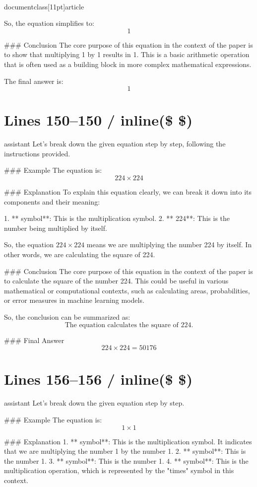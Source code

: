 \\documentclass[11pt]{article}
\begin{document}
So, the equation simplifies to:
\[ 1 \]

### Conclusion
The core purpose of this equation in the context of the paper is to show that multiplying 1 by 1 results in 1. This is a basic arithmetic operation that is often used as a building block in more complex mathematical expressions.

The final answer is:
\[
\boxed{1}
\]


\section*{Lines 150–150 / inline(\$ \$) }
assistant
Let's break down the given equation step by step, following the instructions provided.

### Example
The equation is:
\[ 224 \times 224 \]

### Explanation
To explain this equation clearly, we can break it down into its components and their meaning:

1. ** symbol**: This is the multiplication symbol.
2. ** 224**: This is the number being multiplied by itself.

So, the equation \( 224 \times 224 \) means we are multiplying the number 224 by itself. In other words, we are calculating the square of 224.

### Conclusion
The core purpose of this equation in the context of the paper is to calculate the square of the number 224. This could be useful in various mathematical or computational contexts, such as calculating areas, probabilities, or error measures in machine learning models.

So, the conclusion can be summarized as:
\[ \text{The equation calculates the square of 224.} \]

### Final Answer
\[
\boxed{224 \times 224 = 50176}
\]


\section*{Lines 156–156 / inline(\$ \$) }
assistant
Let's break down the given equation step by step.

### Example
The equation is:
\[ 1 \times 1 \]

### Explanation
1. ** symbol**: This is the multiplication symbol. It indicates that we are multiplying the number 1 by the number 1.
2. ** symbol**: This is the number 1.
3. ** symbol**: This is the number 1.
4. ** symbol**: This is the multiplication operation, which is represented by the "times" symbol in this context.
\end{document}
